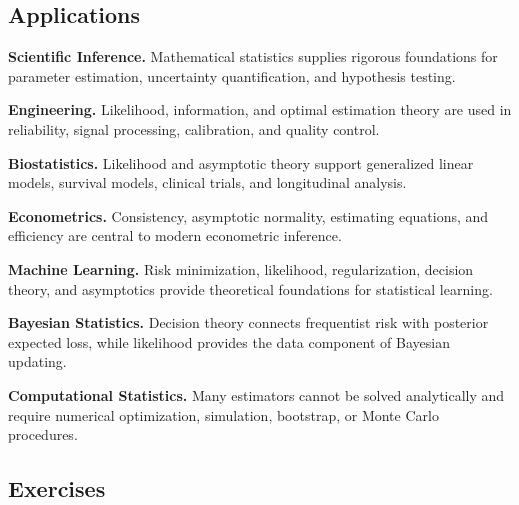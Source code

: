 \subsection{Applications}
\label{subsec:mathematical-statistics-applications}

\begin{applicationbox}

\textbf{Scientific Inference.}
Mathematical statistics supplies rigorous foundations for parameter
estimation, uncertainty quantification, and hypothesis testing.

\medskip

\textbf{Engineering.}
Likelihood, information, and optimal estimation theory are used in
reliability, signal processing, calibration, and quality control.

\medskip

\textbf{Biostatistics.}
Likelihood and asymptotic theory support generalized linear models,
survival models, clinical trials, and longitudinal analysis.

\medskip

\textbf{Econometrics.}
Consistency, asymptotic normality, estimating equations, and efficiency
are central to modern econometric inference.

\medskip

\textbf{Machine Learning.}
Risk minimization, likelihood, regularization, decision theory, and
asymptotics provide theoretical foundations for statistical learning.

\medskip

\textbf{Bayesian Statistics.}
Decision theory connects frequentist risk with posterior expected loss,
while likelihood provides the data component of Bayesian updating.

\medskip

\textbf{Computational Statistics.}
Many estimators cannot be solved analytically and require numerical
optimization, simulation, bootstrap, or Monte Carlo procedures.

\end{applicationbox}

\subsection{Exercises}
\label{subsec:mathematical-statistics-exercises}

